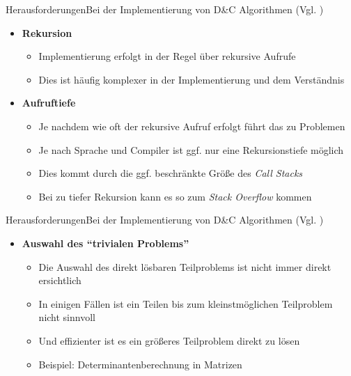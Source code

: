 \begin{frame}{Herausforderungen}{Bei der Implementierung von D\&C Algorithmen (Vgl. \cite{wiki:dac})}
\begin{itemize}
    \item \textbf{Rekursion}
    \begin{itemize}
        \item Implementierung erfolgt in der Regel über rekursive Aufrufe
        \item Dies ist häufig komplexer in der Implementierung und dem Verständnis
    \end{itemize}
    \item \textbf{Aufruftiefe}
    \begin{itemize}
        \item Je nachdem wie oft der rekursive Aufruf erfolgt führt das zu Problemen
        \item Je nach Sprache und Compiler ist ggf. nur eine Rekursionstiefe möglich
        \item Dies kommt durch die ggf. beschränkte Größe des \textit{Call Stacks}
        \item Bei zu tiefer Rekursion kann es so zum \textit{Stack Overflow} kommen
    \end{itemize}
\end{itemize}
\end{frame}

\begin{frame}{Herausforderungen}{Bei der Implementierung von D\&C Algorithmen (Vgl. \cite{wiki:dac})}
    \begin{itemize}
        \item \textbf{Auswahl des "`trivialen Problems"'}
        \begin{itemize}
            \item Die Auswahl des direkt lösbaren Teilproblems ist nicht immer direkt ersichtlich
            \item In einigen Fällen ist ein Teilen bis zum kleinstmöglichen Teilproblem nicht sinnvoll
            \item Und effizienter ist es ein größeres Teilproblem direkt zu lösen
            \item Beispiel: Determinantenberechnung in Matrizen
        \end{itemize}
    \end{itemize}
\end{frame}